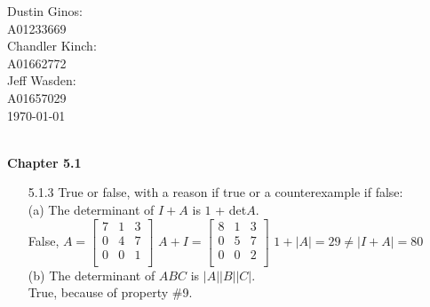 \documentclass[10pt,twoside,reqno]{article}
\begin{document}
\begin{flushright}
\begin{minipage}{.25\textwidth}
Dustin Ginos: \\
A01233669\\
Chandler Kinch: \\
A01662772\\
Jeff Wasden: \\
A01657029\\

\today
\end{minipage}
\end{flushright}

\\
\vspace{5mm}
\textbf{Chapter 5.1}
\begin{enumerate}
\item[5.1.3] True or false, with a reason if true or a counterexample if false: \\
{\addtolength{\leftskip}{10mm}
(a) The determinant of $I+A$ is $1$ + det$A$. \\ \vspace{2mm}
\hspace{3mm}
False,
\hspace{5mm}
$
A=
\begin{bmatrix}
7&1&3\\
0&4&7\\
0&0&1\\
\end{bmatrix}
$
\hspace{5mm}
$
A+I=
\begin{bmatrix}
8&1&3\\
0&5&7\\
0&0&2\\
\end{bmatrix}
$
\hspace{5mm}
$1+|A|=29\neq|I+A|=80$ \\ \vspace{3mm}
(b) The determinant of $ABC$ is $|A||B||C|$. \\ \vspace{2mm}
\hspace{3mm}
True, because of property \#9. \\
\vspace{3mm}
}
\end{enumerate}
\end{document}
